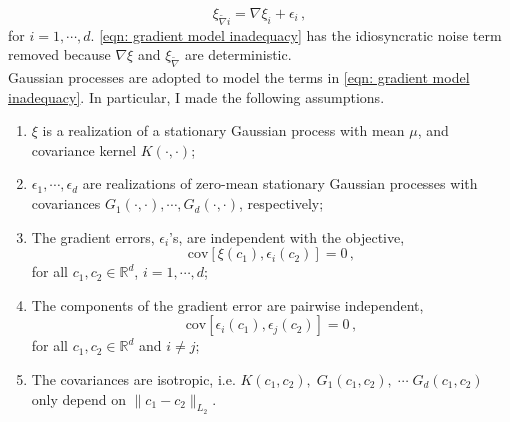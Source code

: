 \begin{equation}
    \left.\xi_{\tilde{\nabla}i}\right. 
    = \left. \nabla \xi_i\right. + 
      {{\epsilon}_i}\,,
\label{eqn: gradient model inadequacy}
\end{equation}
for $i=1,\cdots, d$. \eqref{eqn: gradient model inadequacy} has
the idiosyncratic noise term removed 
because $\nabla \xi$ and $\xi_{\tilde{\nabla}}$ are deterministic.\\

Gaussian processes are adopted to model the terms in \eqref{eqn: gradient model inadequacy}. 
In particular, I made the following assumptions.
\begin{enumerate}
     \item $\xi$ is a realization of a stationary Gaussian process with mean $\mu$,
           and covariance kernel $K(\cdot, \cdot)$;
     \item $\epsilon_1, \cdots, \epsilon_d$ are realizations of zero-mean stationary
           Gaussian processes with covariances $G_1(\cdot, \cdot), \cdots, 
           G_d(\cdot, \cdot)$, respectively;
     \item The gradient errors, $\epsilon_i$'s, are independent with the objective,
     \begin{equation}
         \textrm{cov} \left[\xi(c_1), {\epsilon}_i(c_2) \right] = 0\,,
     \end{equation}
     for all $c_1, c_2 \in \mathbb{R}^d$, $i=1,\cdots, d$;
     \item The components of the gradient error are pairwise independent,
      $$
         \textrm{cov} \left[\epsilon_i(c_1), \epsilon_j(c_2)\right] = 0\,,
      $$
      for all $c_1, c_2 \in \mathbb{R}^d$ and $i\neq j$;
      \item The covariances are isotropic, i.e.
      $K(c_1, c_2), \; G_1(c_1, c_2),\; \cdots\; G_d(c_1, c_2)$ only depend on
      $\big\|c_1-c_2\big\|_{L_2}$.
\end{enumerate}

